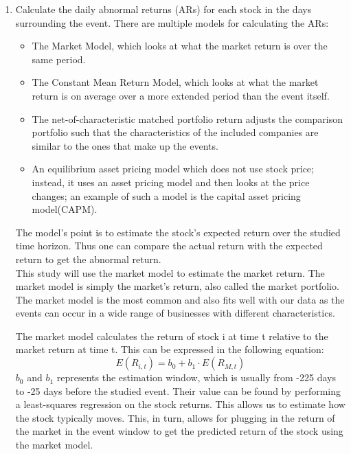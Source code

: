 \begin{enumerate}

    \item Calculate the daily abnormal returns (ARs) for each stock in the days surrounding the event. There are multiple models for calculating the ARs:
    
    \begin{itemize}
        \item The Market Model, which looks at what the market return is over the same period.
        \item The Constant Mean Return Model, which looks at what the market return is on average over a more extended period than the event itself.
        \item The net-of-characteristic matched portfolio return adjusts the comparison portfolio such that the characteristics of the included companies are similar to the ones that make up the events.
        \item An equilibrium asset pricing model which does not use stock price; instead, it uses an asset pricing model and then looks at the price changes; an example of such a model is the capital asset pricing model(CAPM).
        
    \end{itemize}
    The model's point is to estimate the stock's expected return over the studied time horizon. Thus one can compare the actual return with the expected return to get the abnormal return. \\ This study will use the market model to estimate the market return. The market model is simply the market's return, also called the market portfolio. The market model is the most common and also fits well with our data as the events can occur in a wide range of businesses with different characteristics.
    
    The market model calculates the return of stock i at time t relative to the market return at time t. This can be expressed in the following equation: 
    $$
E\left(R_{i, t}\right)=b_{0}+b_{1} \cdot E\left(R_{M, t}\right)
$$
$b_{0}$ and $b_{1}$ represents the estimation window, which is usually from -225 days to -25 days before the studied event. Their value can be found by performing a least-squares regression on the stock returns. This allows us to estimate how the stock typically moves. This, in turn, allows for plugging in the return of the market in the event window to get the predicted return of the stock using the market model.
    

\end{enumerate}
